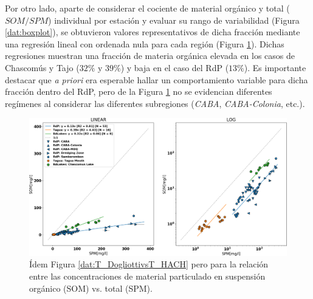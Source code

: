         Por otro lado, aparte de considerar el cociente de material orgánico y total ($SOM/SPM$) individual por estación y evaluar su rango de variabilidad (Figura \ref{dat:boxplot}), se obtuvieron valores representativos de dicha fracción mediante una regresión lineal con ordenada nula para cada región (Figura \ref{dat:SOMvsSPM}). Dichas regresiones muestran una fracción de materia orgánica elevada en los casos de Chascomús y Tajo ($32\%$ y $39\%$) y baja en el caso del RdP ($13\%$). Es importante destacar que \textit{a priori} era esperable hallar un comportamiento variable para dicha fracción dentro del RdP, pero de la Figura \ref{dat:SOMvsSPM} no se evidencian diferentes regímenes al considerar las diferentes subregiones (\textit{CABA}, \textit{CABA-Colonia}, etc.).

        \begin{figure}
        \centering
        \includegraphics[width=\textwidth]{dat/figures/ScatterSOMvsSPM.png}
        \caption[Relación entre las concentraciones de material particulado en suspensión orgánico (SOM) vs. total (SPM).]{Ídem Figura \ref{dat:T_DogliottivsT_HACH} pero para la relación entre las concentraciones de material particulado en suspensión orgánico (SOM) vs. total (SPM).}
        \label{dat:SOMvsSPM}
        \end{figure}
        
